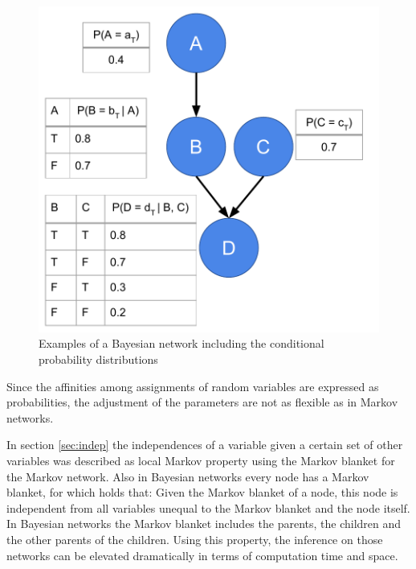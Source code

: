 \begin{figure}[htpb]
  \centering
  	\includegraphics[scale=0.6]{img/bayes.pdf} 
  \caption{Examples of a Bayesian network including the conditional probability distributions}
  \label{fig:bayes}
\end{figure}

Since the affinities among assignments of random variables are expressed as probabilities, the adjustment of the parameters are not as flexible as in Markov networks.

In section \ref{sec:indep} the independences of a variable given a certain set of other variables was described as local Markov property using the Markov blanket for the Markov network. Also in Bayesian networks every node has a Markov blanket, for which holds that: Given the Markov blanket of a node, this node is independent from all variables unequal to the Markov blanket and the node itself. In Bayesian networks the Markov blanket includes the parents, the children and the other parents of the children. Using this property, the inference on those networks can be elevated dramatically in terms of computation time and space.



